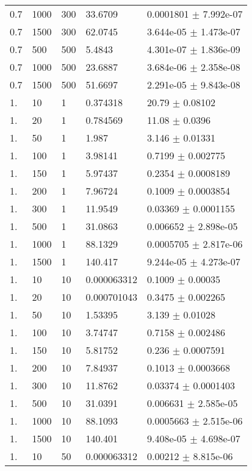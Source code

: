 \begin{longtable}{lllll}
 0.7 &  1000 &   300 &  33.6709 & 0.0001801 $\pm$ 7.992e-07 \\
 0.7 &  1500 &   300 &  62.0745 & 3.644e-05 $\pm$ 1.473e-07 \\
 0.7 &   500 &   500 &   5.4843 & 4.301e-07 $\pm$ 1.836e-09 \\
 0.7 &  1000 &   500 &  23.6887 & 3.684e-06 $\pm$ 2.358e-08 \\
 0.7 &  1500 &   500 &  51.6697 & 2.291e-05 $\pm$ 9.843e-08 \\
  1. &    10 &     1 & 0.374318 &    20.79 $\pm$  0.08102 \\
  1. &    20 &     1 & 0.784569 &    11.08 $\pm$   0.0396 \\
  1. &    50 &     1 &    1.987 &    3.146 $\pm$  0.01331 \\
  1. &   100 &     1 &  3.98141 &   0.7199 $\pm$ 0.002775 \\
  1. &   150 &     1 &  5.97437 &   0.2354 $\pm$ 0.0008189 \\
  1. &   200 &     1 &  7.96724 &   0.1009 $\pm$ 0.0003854 \\
  1. &   300 &     1 &  11.9549 &  0.03369 $\pm$ 0.0001155 \\
  1. &   500 &     1 &  31.0863 & 0.006652 $\pm$ 2.898e-05 \\
  1. &  1000 &     1 &  88.1329 & 0.0005705 $\pm$ 2.817e-06 \\
  1. &  1500 &     1 &  140.417 & 9.244e-05 $\pm$ 4.273e-07 \\
  1. &    10 &    10 & 0.000063312 &   0.1009 $\pm$  0.00035 \\
  1. &    20 &    10 & 0.000701043 &   0.3475 $\pm$ 0.002265 \\
  1. &    50 &    10 &  1.53395 &    3.139 $\pm$  0.01028 \\
  1. &   100 &    10 &  3.74747 &   0.7158 $\pm$ 0.002486 \\
  1. &   150 &    10 &  5.81752 &    0.236 $\pm$ 0.0007591 \\
  1. &   200 &    10 &  7.84937 &   0.1013 $\pm$ 0.0003668 \\
  1. &   300 &    10 &  11.8762 &  0.03374 $\pm$ 0.0001403 \\
  1. &   500 &    10 &  31.0391 & 0.006631 $\pm$ 2.585e-05 \\
  1. &  1000 &    10 &  88.1093 & 0.0005663 $\pm$ 2.515e-06 \\
  1. &  1500 &    10 &  140.401 & 9.408e-05 $\pm$ 4.698e-07 \\
  1. &    10 &    50 & 0.000063312 &  0.00212 $\pm$ 8.815e-06 \\

\end{longtable}
